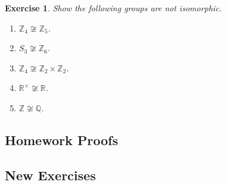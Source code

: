\documentclass[12pt]{article}
\newcommand{\Z}{\mathbb{Z}}
\newcommand{\R}{\mathbb{R}}
\newcommand{\Q}{\mathbb{Q}}
\newtheorem{exer}{Exercise}
\numberwithin{problem}{section} %
\numberwithin{defn}{section} %
\numberwithin{thm}{section} %
\numberwithin{exer}{section} %
\numberwithin{lma}{section} %
\numberwithin{crlly}{section} %
\theoremstyle{remark}  %
\begin{document}
\setcounter{exer}{95}
\begin{exer}
    Show the following groups are not isomorphic.
    \begin{enumerate}[label=(\alph*)]
        \item $\Z_4 \not \cong \Z_5$.
        \item $S_3 \not \cong \Z_6$.
        \item $\Z_4 \not \cong \Z_2 \times \Z_2$.
        \item $\R^\times \not \cong \R$.
        \item $\Z \not \cong \Q$.
    \end{enumerate}
\end{exer}

\subsection{Homework Proofs}

\subsection{New Exercises}
\end{document}
